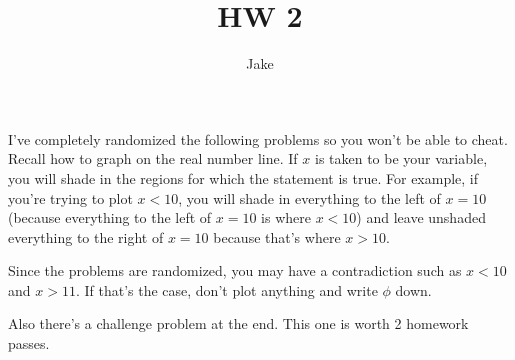 \documentclass[12pt]{article}
\begin{document}
			\title{HW 2}
			\author{Jake}
			\date{}
			\maketitle
I've completely randomized the following problems so you won't be able to cheat. Recall how to 
graph on the real number line. If $x$ is taken
to be your variable, you will shade in the regions for which the statement is true. For example, if you're
trying to plot $x < 10$, you will shade in everything to the left of $x = 10$ (because everything to the 
left of $x = 10$ is where $x < 10$) and leave unshaded everything to the right of $x = 10$ because that's where
$x > 10$.

Since the problems are randomized, you may have a contradiction such as $x < 10$ and $x > 11$. If that's the case,
don't plot anything and write $\phi$ down.

Also there's a challenge problem at the end. This one is worth 2 homework passes.
\end{document}
